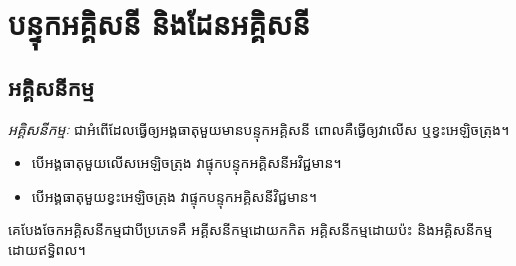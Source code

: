 \chapter{បន្ទុកអគ្គិសនី និងដែនអគ្គិសនី}
\section{អគ្គិសនីកម្ម}
\begin{definition}
	\emph{\kml អគ្គិសនីកម្មៈ} ជាអំពើដែលធ្វើឲ្យអង្គធាតុមួយមានបន្ទុកអគ្គិសនី ពោលគឺធ្វើឲ្យវាលើស ឬខ្វះអេឡិចត្រុង។
	\begin{itemize}
		\item បើអង្គធាតុមួយលើសអេឡិចត្រុង វាផ្ទុកបន្ទុកអគ្គិសនីអវិជ្ជមាន។
		\item បើអង្គធាតុមួយខ្វះអេឡិចត្រុង វាផ្ទុកបន្ទុកអគ្គិសនីវិជ្ជមាន។
	\end{itemize}
\end{definition}
\begin{remark}
	គេបែងចែកអគ្គិសនីកម្មជាបីប្រភេទគឺ អគ្គីសនីកម្មដោយកកិត អគ្គិសនីកម្មដោយប៉ះ និងអគ្គិសនីកម្មដោយឥទ្ធិពល។
\end{remark}

